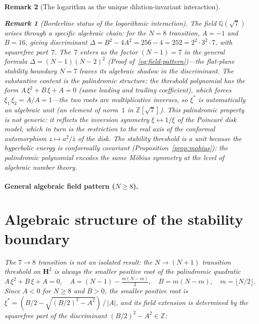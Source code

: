 \documentclass[12pt, a4paper]{article}
\newtheorem{remark}{Remark}[section]
\numberwithin{equation}{section}
\begin{document}
\begin{remark}[The logarithm as the unique dilation-invariant interaction]
\begin{remark}[Borderline status of the logarithmic interaction]
The field $\mathbb{Q}(\sqrt{7})$ arises through a specific algebraic
chain: for the $N = 8$ transition, $A = -1$ and $B = 16$, giving
discriminant $\Delta = B^2 - 4A^2 = 256 - 4 = 252 = 2^2 \cdot 3^2
\cdot 7$, with squarefree part~$7$.  The~$7$ enters as the factor
$(N{-}1) = 7$ in the general formula $\Delta = (N{-}1)(N{-}2)^2$
(Proof of~\eqref{eq:field-pattern})---the flat-plane stability
boundary $N = 7$ leaves its algebraic shadow in the discriminant.
The substantive content is the
\emph{palindromic structure}: the threshold polynomial has the form
$A\,\xi^2 + B\,\xi + A = 0$ (same leading and trailing coefficient),
which forces $\xi_1\,\xi_2 = A/A = 1$---the two roots are
multiplicative inverses, so $\xi^*$ is automatically an algebraic
\emph{unit} (an element of norm~$1$ in $\mathbb{Z}[\sqrt{7}]$).
This palindromic property is not generic: it reflects the inversion
symmetry $\xi\leftrightarrow 1/\xi$ of the Poincar\'e disk model,
which in turn is the restriction to the real axis of the conformal
automorphism $z \mapsto a^2/\bar z$ of the disk.  The stability
threshold is a unit \emph{because} the hyperbolic energy is
conformally covariant (Proposition~\ref{prop:mobius}): the palindromic
polynomial encodes the same M\"obius symmetry at the level of
algebraic number theory.

\paragraph{General algebraic field pattern ($N \ge 8$).}

\section{Algebraic structure of the stability boundary}
\label{sec:algebraic-structure}

The $7\to 8$ transition is not an isolated result: the $N \to (N{+}1)$
transition threshold on $\mathbf{H}^2$ is always the smaller positive root
of the palindromic quadratic
\begin{equation}\label{eq:palindromic}
  A\,\xi^2 + B\,\xi + A = 0,
  \quad
  A = (N-1) - \tfrac{m(N{-}m)}{2},
  \quad
  B = m(N{-}m),
  \quad
  m = \lfloor N/2\rfloor.
\end{equation}
Since $A < 0$ for $N \ge 8$ and $B > 0$, the smaller positive root is
$\xi^* = (B/2 - \sqrt{(B/2)^2 - A^2})\,/\,|A|$, and its field extension
is determined by the squarefree part of the discriminant
$(B/2)^2 - A^2 \in \mathbb{Z}$:


\end{remark}
\end{remark}
\end{document}
